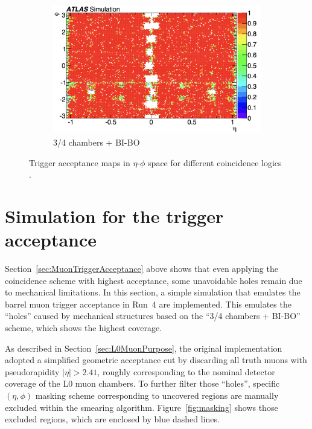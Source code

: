 \begin{figure}[htbp]

  \begin{subfigure}{0.67\textwidth}
    \includegraphics[width=\textwidth]{figs/chapter4/trigger_acceptance_map_3_4_BI_BO.png}
    \caption{3/4 chambers + BI-BO}
    \label{fig:trigger_acceptance_3_4_BI_BO}
  \end{subfigure}

  \caption{Trigger acceptance maps in $\eta$-$\phi$ space for different coincidence logics \cite{TDAQ_TDR}.}
  \label{fig:trigger_acceptance_all}
\end{figure}
\section{Simulation for the trigger acceptance} 
Section~\ref{sec:MuonTriggerAcceptance} above shows that even applying the coincidence scheme with highest acceptance, some unavoidable holes remain due to mechanical limitations. In this section, a simple simulation that emulates the barrel muon trigger acceptance in Run~4 are implemented. This emulates the ``holes'' caused by mechanical structures based on the ``3/4 chambers + BI-BO'' scheme, which shows the highest coverage.

As described in Section~\ref{sec:L0MuonPurpose}, the original implementation adopted a simplified geometric acceptance cut by discarding all truth muons with pseudorapidity $|\eta| > 2.41$, roughly corresponding to the nominal detector coverage of the L0 muon chambers. To further filter those ``holes'', specific $(\eta, \phi)$ masking scheme corresponding to uncovered regions are manually excluded within the smearing algorithm. Figure~\ref{fig:masking} shows those excluded regions, which are enclosed by blue dashed lines.

